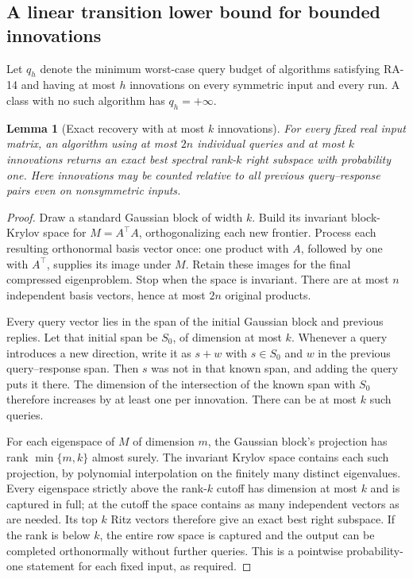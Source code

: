 \documentclass[11pt]{article}
\newtheorem{lemma}[theorem]{Lemma}
\theoremstyle{definition}
\begin{document}
\subsection{A linear transition lower bound for bounded innovations}
Let $q_h$ denote the minimum worst-case query budget of algorithms satisfying RA-14 and having at most $h$ innovations on every symmetric input and every run. A class with no such algorithm has $q_h=+\infty$.

\begin{lemma}[Exact recovery with at most $k$ innovations]\label{lem:exact-innovation}
For every fixed real input matrix, an algorithm using at most $2n$ individual queries and at most $k$ innovations returns an exact best spectral rank-$k$ right subspace with probability one. Here innovations may be counted relative to all previous query--response pairs even on nonsymmetric inputs.
\end{lemma}
\begin{proof}
Draw a standard Gaussian block of width $k$. Build its invariant block-Krylov space for $M=A^\top A$, orthogonalizing each new frontier. Process each resulting orthonormal basis vector once: one product with $A$, followed by one with $A^\top$, supplies its image under $M$. Retain these images for the final compressed eigenproblem. Stop when the space is invariant. There are at most $n$ independent basis vectors, hence at most $2n$ original products.

Every query vector lies in the span of the initial Gaussian block and previous replies. Let that initial span be $S_0$, of dimension at most $k$. Whenever a query introduces a new direction, write it as $s+w$ with $s\in S_0$ and $w$ in the previous query--response span. Then $s$ was not in that known span, and adding the query puts it there. The dimension of the intersection of the known span with $S_0$ therefore increases by at least one per innovation. There can be at most $k$ such queries.

For each eigenspace of $M$ of dimension $m$, the Gaussian block's projection has rank $\min\{m,k\}$ almost surely. The invariant Krylov space contains each such projection, by polynomial interpolation on the finitely many distinct eigenvalues. Every eigenspace strictly above the rank-$k$ cutoff has dimension at most $k$ and is captured in full; at the cutoff the space contains as many independent vectors as are needed. Its top $k$ Ritz vectors therefore give an exact best right subspace. If the rank is below $k$, the entire row space is captured and the output can be completed orthonormally without further queries. This is a pointwise probability-one statement for each fixed input, as required.
\end{proof}
\end{document}
